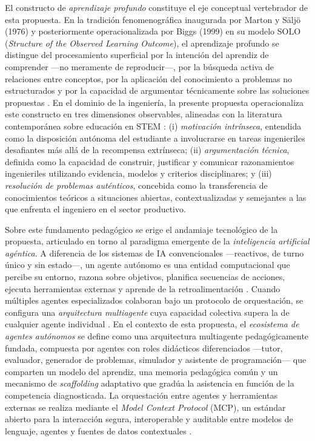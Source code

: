 
El constructo de \emph{aprendizaje profundo} constituye el eje conceptual vertebrador
de esta propuesta. En la tradición fenomenográfica inaugurada por Marton y Säljö
(1976) y posteriormente operacionalizada por Biggs (1999) en su modelo SOLO
(\emph{Structure of the Observed Learning Outcome}), el aprendizaje profundo se
distingue del procesamiento superficial por la intención del aprendiz de comprender
—no meramente de reproducir—, por la búsqueda activa de relaciones entre conceptos,
por la aplicación del conocimiento a problemas no estructurados y por la capacidad de
argumentar técnicamente sobre las soluciones propuestas \cite{marton1976qualitative,
biggs1999teaching}. En el dominio de la ingeniería, la presente propuesta
operacionaliza este constructo en tres dimensiones observables, alineadas con la
literatura contemporánea sobre educación en STEM \cite{freeman2014active,
theobald2020active}: (i) \emph{motivación intrínseca}, entendida como la disposición
autónoma del estudiante a involucrarse en tareas ingenieriles desafiantes más allá de
la recompensa extrínseca; (ii) \emph{argumentación técnica}, definida como la
capacidad de construir, justificar y comunicar razonamientos ingenieriles utilizando
evidencia, modelos y criterios disciplinares; y (iii) \emph{resolución de problemas
auténticos}, concebida como la transferencia de conocimientos teóricos a situaciones
abiertas, contextualizadas y semejantes a las que enfrenta el ingeniero en el sector
productivo.

Sobre este fundamento pedagógico se erige el andamiaje tecnológico de la propuesta,
articulado en torno al paradigma emergente de la \emph{inteligencia artificial
agéntica}. A diferencia de los sistemas de IA convencionales —reactivos, de
turno único y sin estado—, un agente autónomo es una entidad computacional que
percibe su entorno, razona sobre objetivos, planifica secuencias de acciones, ejecuta
herramientas externas y aprende de la retroalimentación \cite{russell2021artificial}.
Cuando múltiples agentes especializados colaboran bajo un protocolo de orquestación,
se configura una \emph{arquitectura multiagente} cuya capacidad colectiva supera la
de cualquier agente individual \cite{wang2024survey, xi2023rise}. En el contexto de
esta propuesta, el \emph{ecosistema de agentes autónomos} se define como una
arquitectura multiagente pedagógicamente fundada, compuesta por agentes con roles
didácticos diferenciados —tutor, evaluador, generador de problemas, simulador y
asistente de programación— que comparten un modelo del aprendiz, una memoria
pedagógica común y un mecanismo de \emph{scaffolding} adaptativo que gradúa la
asistencia en función de la competencia diagnosticada. La orquestación entre agentes
y herramientas externas se realiza mediante el \emph{Model Context Protocol} (MCP),
un estándar abierto para la interacción segura, interoperable y auditable entre
modelos de lenguaje, agentes y fuentes de datos contextuales
\cite{anthropic2024mcp}.


